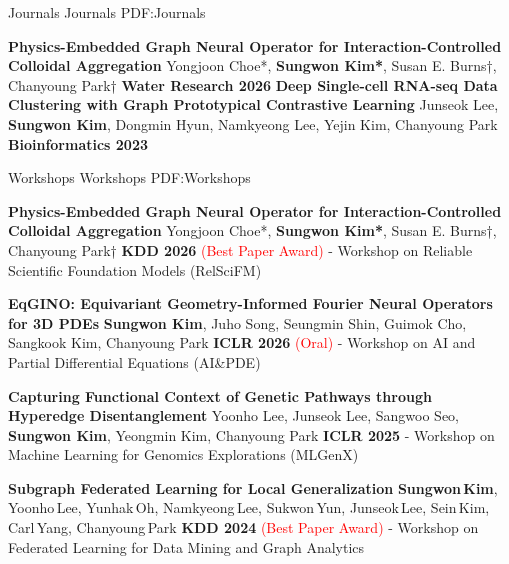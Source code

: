\documentclass[letterpaper,MMMyyyy,nonstopmode]{simpleresumecv}
\begin{document}
\begin{Body}
\SubSection
{Journals}
{Journals}
{PDF:Journals}

\begingroup
\renewcommand{\MaxNumberedItem}{[8888]}
\Gap
\NumberedItem{[J2]}
\textbf{Physics-Embedded Graph Neural Operator for Interaction-Controlled Colloidal Aggregation}
\newline
Yongjoon Choe*, \textbf{Sungwon Kim*}, Susan E. Burns†, Chanyoung Park†
\newline
\textbf{Water Research 2026}
\Gap
\NumberedItem{[J1]}
\textbf{Deep Single-cell RNA-seq Data Clustering with Graph Prototypical Contrastive Learning}
\newline
Junseok Lee, \textbf{Sungwon Kim}, Dongmin Hyun, Namkyeong Lee, Yejin Kim, Chanyoung Park
\newline
\textbf{Bioinformatics 2023}

\endgroup
\Gap

\SubSection
{Workshops}
{Workshops}
{PDF:Workshops}

\begingroup
\renewcommand{\MaxNumberedItem}{[8888]}

\Gap
\NumberedItem{[W6]}
\textbf{Physics-Embedded Graph Neural Operator for Interaction-Controlled Colloidal Aggregation}
\newline
Yongjoon Choe*, \textbf{Sungwon Kim*}, Susan E. Burns†, Chanyoung Park†
\newline
\textbf{KDD 2026} \textcolor{red}{(Best Paper Award)} - Workshop on Reliable Scientific Foundation Models (RelSciFM)

\Gap
\NumberedItem{[W5]}
\textbf{EqGINO: Equivariant Geometry-Informed Fourier Neural Operators for 3D PDEs}
\newline
\textbf{Sungwon Kim}, Juho Song, Seungmin Shin, Guimok Cho, Sangkook Kim, Chanyoung Park
\newline
\textbf{ICLR 2026} \textcolor{red}{(Oral)} - Workshop on AI and Partial Differential Equations (AI\&PDE)

\Gap
\NumberedItem{[W4]}
\textbf{Capturing Functional Context of Genetic Pathways through Hyperedge Disentanglement}
\newline
Yoonho Lee, Junseok Lee, Sangwoo Seo, \textbf{Sungwon Kim}, Yeongmin Kim, Chanyoung Park
\newline
\textbf{ICLR 2025} - Workshop on Machine Learning for Genomics Explorations (MLGenX)

\Gap
\NumberedItem{[W3]}
\textbf{Subgraph Federated Learning for Local Generalization}
\newline
\textbf{Sungwon\,Kim}, Yoonho\,Lee, Yunhak\,Oh, Namkyeong\,Lee, Sukwon\,Yun, Junseok\,Lee, Sein\,Kim, Carl\,Yang, Chanyoung\,Park
\newline
\textbf{KDD 2024} \textcolor{red}{(Best Paper Award)} - Workshop on Federated Learning for Data Mining and Graph Analytics


\end{Body}
\end{document}
